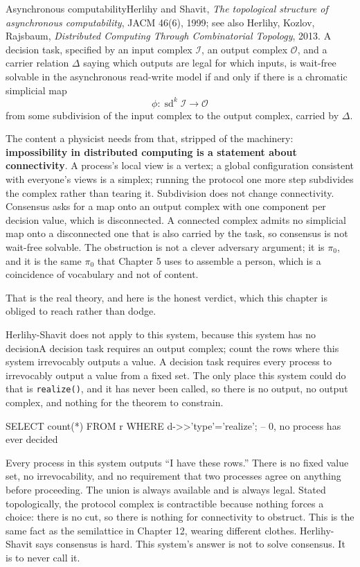 \begin{Theorem}{Asynchronous computability}{Herlihy and Shavit, \emph{The topological structure of asynchronous computability}, JACM 46(6), 1999; see also Herlihy, Kozlov, Rajsbaum, \emph{Distributed Computing Through Combinatorial Topology}, 2013.}
A decision task, specified by an input complex $\mathcal{I}$, an output complex $\mathcal{O}$, and a carrier relation $\Delta$ saying which outputs are legal for which inputs, is wait-free solvable in the asynchronous read-write model if and only if there is a chromatic simplicial map
\[ \phi: \operatorname{sd}^{k}\mathcal{I} \longrightarrow \mathcal{O} \]
from some subdivision of the input complex to the output complex, carried by $\Delta$.
\end{Theorem}

The content a physicist needs from that, stripped of the machinery: \textbf{impossibility in distributed computing is a statement about connectivity}. A process's local view is a vertex; a global configuration consistent with everyone's views is a simplex; running the protocol one more step subdivides the complex rather than tearing it. Subdivision does not change connectivity. Consensus asks for a map onto an output complex with one component per decision value, which is disconnected. A connected complex admits no simplicial map onto a disconnected one that is also carried by the task, so consensus is not wait-free solvable. The obstruction is not a clever adversary argument; it is $\pi_0$, and it is the same $\pi_0$ that Chapter 5 uses to assemble a person, which is a coincidence of vocabulary and not of content.

That is the real theory, and here is the honest verdict, which this chapter is obliged to reach rather than dodge.

\begin{Correspondence}{Herlihy-Shavit does not apply to this system, because this system has no decision}{A decision task requires an output complex; count the rows where this system irrevocably outputs a value.}
A decision task requires every process to irrevocably output a value from a fixed set. The only place this system could do that is \texttt{realize()}, and it has never been called, so there is no output, no output complex, and nothing for the theorem to constrain.
\begin{Check}
SELECT count(*) FROM r WHERE d->>'type'='realize';   -- 0, no process has ever decided
\end{Check}
Every process in this system outputs ``I have these rows.'' There is no fixed value set, no irrevocability, and no requirement that two processes agree on anything before proceeding. The union is always available and is always legal. Stated topologically, the protocol complex is contractible because nothing forces a choice: there is no cut, so there is nothing for connectivity to obstruct. This is the same fact as the semilattice in Chapter 12, wearing different clothes. Herlihy-Shavit says consensus is hard. This system's answer is not to solve consensus. It is to never call it.
\end{Correspondence}


